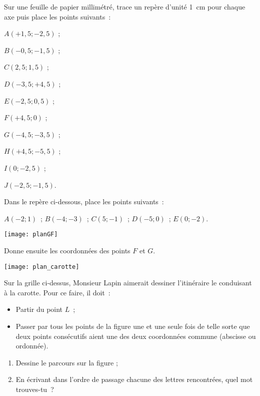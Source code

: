 \begin{exercice}
Sur une feuille de papier millimétré, trace un repère d'unité 1 cm pour chaque axe puis place les points suivants :
\begin{colitemize}{2}
 \item $A(+1,5 ; -2,5)$ ;
 \item $B(-0,5 ; -1,5)$ ;
 \item $C(2,5 ; 1,5)$ ;
 \item $D(-3,5 ; +4,5)$ ;
 \item $E(-2,5 ; 0,5)$ ;
 \item $F(+4,5 ; 0)$ ;
 \item $G(-4,5 ; -3,5)$ ;
 \item $H(+4,5 ; -5,5)$ ;
 \item $I(0 ; -2,5)$ ;
 \item $J(-2,5 ; -1,5)$.
 \end{colitemize}
\end{exercice}


\begin{exercice}
Dans le repère ci-dessous, place les points suivants : 

$A(-2 ; 1)$ ; $B(-4 ; -3)$ ; $C(5 ; -1)$ ; $D(-5 ; 0)$ ; $E(0 ; -2)$.
\begin{center} \texttt{[image: planGF]} \end{center}
Donne ensuite les coordonnées des points $F$ et $G$.
\end{exercice}


\newpage 

\begin{exercice}
\begin{center} \texttt{[image: plan\_carotte]} \end{center}
Sur la grille ci-dessus, Monsieur Lapin aimerait dessiner l'itinéraire le conduisant à la carotte. Pour ce faire, il doit : 
\begin{itemize}
 \item Partir du point $L$ ; 
 \item Passer par tous les points de la figure une et une seule fois de telle sorte que deux points consécutifs aient une des deux coordonnées commune (abscisse ou ordonnée).
 \end{itemize}
 \begin{enumerate}
  \item Dessine le parcours sur la figure ;
  \item En écrivant dans l'ordre de passage chacune des lettres rencontrées, quel mot trouves-tu ?
  \end{enumerate}
\end{exercice}



